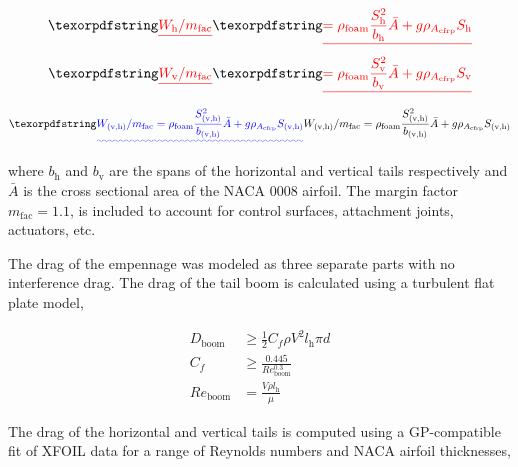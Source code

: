 \DIFdelbegin \begin{eqnarray*}
    \DIFdel{\label{e:htweight}
    W_{\text{h}}/m_{\text{fac}} }&\DIFdel{= \rho_{\text{foam}} \frac{S_{\text{h}}^2}{b_{\text{h}}} \bar{A} + g\rho_{A_{\text{cfrp}}} S_{\text{h}} }\\
    \DIFdel{\label{e:vtweight}
    W_{\text{v}}/m_{\text{fac}} }&\DIFdel{= \rho_{\text{foam}} \frac{S_{\text{v}}^2}{b_{\text{v}}} \bar{A} + g\rho_{A_{\text{cfrp}}} S_{\text{v}}
}\end{eqnarray*}
\DIFdelend \DIFaddbegin \begin{equation}
    \DIFadd{W_{\text{(v,h)}}/m_{\text{fac}} = \rho_{\text{foam}} \frac{S_{\text{(v,h)}}^2}{b_{\text{(v,h)}}} \bar{A} + g\rho_{A_{\text{cfrp}}} S_{\text{(v,h)}} }\\
\end{equation}
\DIFaddend 

where $b_{\text{h}}$ and $b_{\text{v}}$ are the spans of the horizontal and vertical tails respectively and $\bar{A}$ is the cross sectional area of the NACA 0008 airfoil. The margin factor $m_{\text{fac}}=1.1$, is included to account for control surfaces, attachment joints, actuators, etc. 

The drag of the empennage was modeled as three separate parts with no interference drag.  The drag of the tail boom is calculated using a turbulent flat plate model,

\begin{align}
    \label{e:boomdrag}
    D_{\text{boom}} &\geq \frac{1}{2} C_f \rho V^2 l_{\text{h}}\pi d \\
    C_f &\geq \frac{0.445}{Re_{\text{boom}}^{0.3}} \\
    Re_{\text{boom}} &= \frac{V\rho l_{\text{h}}}{\mu}
\end{align}

The drag of the horizontal and vertical tails is computed using a GP-compatible fit of XFOIL data for a range of Reynolds numbers and NACA airfoil thicknesses,

